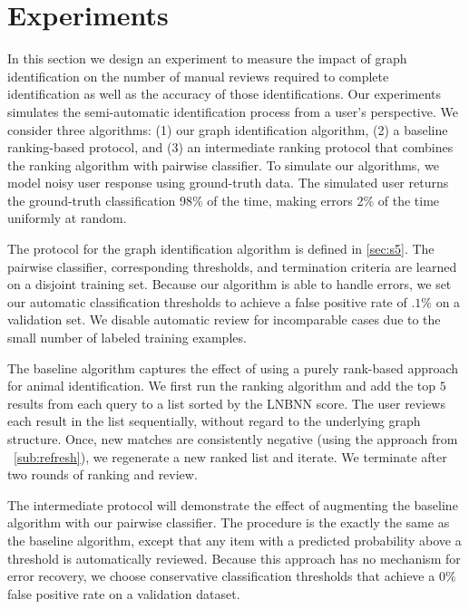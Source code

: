 \section{Experiments}\label{sec:graphexpt}
    In this section we design an experiment to measure the impact of graph identification on the number of manual
    reviews required to complete identification as well as the accuracy of those identifications. Our experiments
    simulates the semi-automatic identification process from a user's perspective. We consider three algorithms: (1) our
    graph identification algorithm, (2) a baseline ranking-based protocol, and (3) an intermediate ranking protocol that
    combines the ranking algorithm with pairwise classifier. To simulate our algorithms, we model noisy user response
    using ground-truth data. The simulated user returns the ground-truth classification 98\% of the
    time, making errors 2\% of the time uniformly at random.

    The protocol for the graph identification algorithm is defined in \cref{sec:s5}. The pairwise classifier,
    corresponding thresholds, and termination criteria are learned on a disjoint training set. Because our algorithm is
    able to handle errors, we set our automatic classification thresholds to achieve a false positive rate of $.1\%$ 
    on a validation set. We disable automatic review for incomparable cases due to the small number of labeled training
    examples.

    The baseline algorithm captures the effect of using a purely rank-based approach for animal identification. We first
    run the ranking algorithm and add the top $5$ results from each query to a list sorted by the LNBNN score. The user
    reviews each result in the list sequentially, without regard to the underlying graph structure. Once, new matches
    are consistently negative (using the approach from ~\cref{sub:refresh}), we regenerate a new ranked list and
    iterate. We terminate after two rounds of ranking and review.

    The intermediate protocol will demonstrate the effect of augmenting the baseline algorithm with our pairwise
    classifier. The procedure is the exactly the same as the baseline algorithm, except that any item with a predicted
    probability above a threshold is automatically reviewed. Because this approach has no mechanism for error recovery,
    we choose conservative classification thresholds that achieve a $0\%$ false 
    positive rate on a validation dataset.

